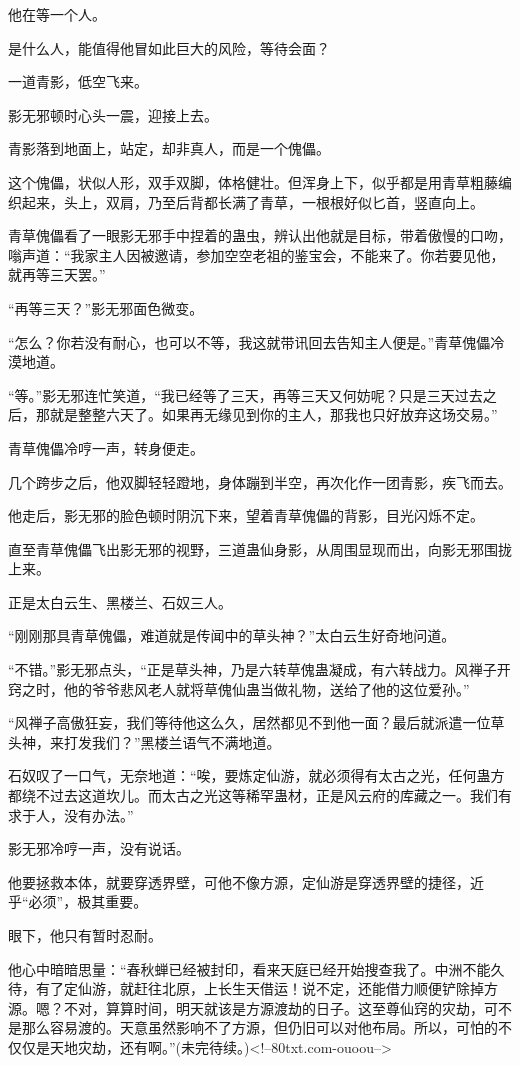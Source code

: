 \begin{this_body}
他在等一个人。

是什么人，能值得他冒如此巨大的风险，等待会面？

一道青影，低空飞来。

影无邪顿时心头一震，迎接上去。

青影落到地面上，站定，却非真人，而是一个傀儡。

这个傀儡，状似人形，双手双脚，体格健壮。但浑身上下，似乎都是用青草粗藤编织起来，头上，双肩，乃至后背都长满了青草，一根根好似匕首，竖直向上。

青草傀儡看了一眼影无邪手中捏着的蛊虫，辨认出他就是目标，带着傲慢的口吻，嗡声道：“我家主人因被邀请，参加空空老祖的鉴宝会，不能来了。你若要见他，就再等三天罢。”

“再等三天？”影无邪面色微变。

“怎么？你若没有耐心，也可以不等，我这就带讯回去告知主人便是。”青草傀儡冷漠地道。

“等。”影无邪连忙笑道，“我已经等了三天，再等三天又何妨呢？只是三天过去之后，那就是整整六天了。如果再无缘见到你的主人，那我也只好放弃这场交易。”

青草傀儡冷哼一声，转身便走。

几个跨步之后，他双脚轻轻蹬地，身体蹦到半空，再次化作一团青影，疾飞而去。

他走后，影无邪的脸色顿时阴沉下来，望着青草傀儡的背影，目光闪烁不定。

直至青草傀儡飞出影无邪的视野，三道蛊仙身影，从周围显现而出，向影无邪围拢上来。

正是太白云生、黑楼兰、石奴三人。

“刚刚那具青草傀儡，难道就是传闻中的草头神？”太白云生好奇地问道。

“不错。”影无邪点头，“正是草头神，乃是六转草傀蛊凝成，有六转战力。风禅子开窍之时，他的爷爷悲风老人就将草傀仙蛊当做礼物，送给了他的这位爱孙。”

“风禅子高傲狂妄，我们等待他这么久，居然都见不到他一面？最后就派遣一位草头神，来打发我们？”黑楼兰语气不满地道。

石奴叹了一口气，无奈地道：“唉，要炼定仙游，就必须得有太古之光，任何蛊方都绕不过去这道坎儿。而太古之光这等稀罕蛊材，正是风云府的库藏之一。我们有求于人，没有办法。”

影无邪冷哼一声，没有说话。

他要拯救本体，就要穿透界壁，可他不像方源，定仙游是穿透界壁的捷径，近乎“必须”，极其重要。

眼下，他只有暂时忍耐。

他心中暗暗思量：“春秋蝉已经被封印，看来天庭已经开始搜查我了。中洲不能久待，有了定仙游，就赶往北原，上长生天借运！说不定，还能借力顺便铲除掉方源。嗯？不对，算算时间，明天就该是方源渡劫的日子。这至尊仙窍的灾劫，可不是那么容易渡的。天意虽然影响不了方源，但仍旧可以对他布局。所以，可怕的不仅仅是天地灾劫，还有啊。”(未完待续。)<!--80txt.com-ouoou-->

\end{this_body}

